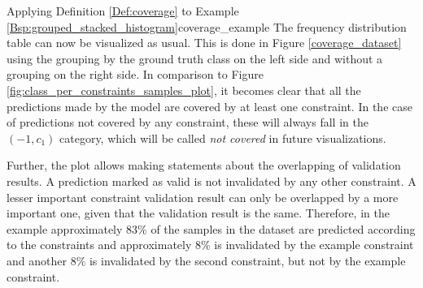 \begin{Bsp}{Applying Definition \ref{Def:coverage} to Example \ref{Bsp:grouped_stacked_histogram}}{coverage_example}
    The frequency distribution table can now be visualized as usual. This is done in Figure \ref{coverage_dataset} using the grouping by the ground truth class on the left side and without a grouping on the right side. In comparison to Figure \ref{fig:class_per_constraints_samples_plot}, it becomes clear that all the predictions made by the model are covered by at least one constraint. In the case of predictions not covered by any constraint, these will always fall in the $(-1,c_1)$ category, which will be called \emph{not covered} in future visualizations.
    
    Further, the plot allows making statements about the overlapping of validation results. A prediction marked as valid is not invalidated by any other constraint. A lesser important constraint validation result can only be overlapped by a more important one, given that the validation result is the same. Therefore, in the example approximately $83\%$ of the samples in the dataset are predicted according to the constraints and approximately $8\%$ is invalidated by the example constraint and another $8\%$ is invalidated by the second constraint, but not by the example constraint.
   

\end{Bsp}
